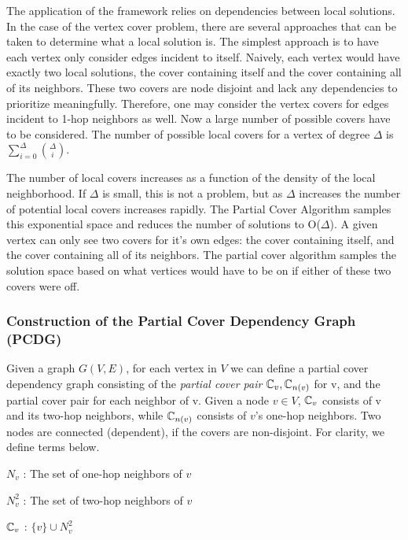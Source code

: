 The application of the framework relies on dependencies between local solutions. In the case of the vertex cover problem, there are several approaches that can be taken to determine what a local solution is. The simplest approach is to have each vertex only consider edges incident to itself. Naively, each vertex would have exactly two local solutions, the cover containing itself and the cover containing all of its neighbors. These two covers are node disjoint and lack any dependencies to prioritize meaningfully.   Therefore, one may consider the vertex covers for edges incident to 1-hop neighbors as well. Now a large number of possible covers have to be considered. The number of possible local covers for a vertex of degree $\Delta$ is $\sum_{i=0}^\Delta \binom{\Delta}{i}$. 

\label{sec:PCDG}
The number of local covers increases as a function of the density of the local neighborhood. If $\Delta$ is small, this is not a problem, but as $\Delta$ increases the number of potential local covers increases rapidly. The Partial Cover Algorithm samples this exponential space and reduces the number of solutions to O($\Delta$). A given vertex can only see two covers for it's own edges: the cover containing itself, and the cover containing all of its neighbors. The partial cover algorithm samples the solution space based on what vertices would have to be on if either of these two covers were off. 

\subsubsection{Construction of the  Partial Cover Dependency Graph (PCDG)}

Given a graph $G(V,E)$, for each vertex in $V$ we can define a partial cover dependency graph consisting of the {\em partial cover pair} ${\mathbb C}_v, {\mathbb C}_{n(v)}$ for v, and the partial cover pair for each neighbor of v. Given a node $v \in V$, ${\mathbb C}_v$ consists of v and its two-hop neighbors, while ${\mathbb C}_{n(v)}$ consists of $v$'s one-hop neighbors. Two nodes are connected (dependent), if the covers are non-disjoint. For clarity, we define terms below.

\begin{defn}
$N_v$ : The set of one-hop neighbors of $v$
\end{defn}
\begin{defn}
$N_v^2$ : The set of two-hop neighbors of $v$ 
\end{defn}

\begin{defn}
${\mathbb C}_v$ : $\{v\} \cup N_v^2$
\end{defn}

